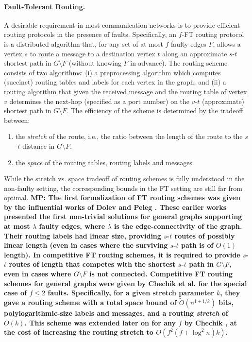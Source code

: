 \paragraph{Fault-Tolerant Routing.} A desirable requirement in most communication networks is to provide efficient routing protocols in the presence of faults. Specifically, an $f$-FT routing protocol is a distributed algorithm that, for any set of at most $f$ faulty edges $F$, allows a vertex $s$ to route a message to a destination vertex $t$ along an approximate $s$-$t$ shortest path in $G \setminus F$ (without knowing $F$ in advance). The routing scheme consists of two algorithms: (i) a preprocessing algorithm which computes (succinct) routing tables and labels for each vertex in the graph; and (ii) a routing algorithm that given the received message and the routing table of vertex $v$ determines the next-hop (specified as a port number) on the $v$-$t$ (approximate) shortest path in $G \setminus F$. The efficiency of the scheme is determined by the tradeoff between: 
\begin{enumerate}[noitemsep]
\item the \emph{stretch} of the route, i.e., the ratio between the length of the route to the $s$-$t$ distance in $G \setminus F$. 
\item the \emph{space} of the routing tables, routing labels and messages. 
\end{enumerate}
While the stretch vs. space tradeoff of routing schemes is fully understood in the non-faulty setting, the corresponding bounds in the FT setting are still far from optimal.  \textbf{MP: The first formalization of FT routing schemes was given by the influential works of Dolev \cite{dolev1984new} and Peleg \cite{peleg1987fault}. These earlier works presented the first non-trivial solutions for general graphs supporting at most $\lambda$ faulty edges, where $\lambda$ is the edge-connectivity of the graph. Their routing labels had linear size, providing $s$-$t$ routes of possibly linear length (even in cases where the surviving $s$-$t$ path is of $O(1)$ length). In competitive FT routing schemes, it is required to provide $s$-$t$ routes of length that competes with the shortest $s$-$t$ path in $G \setminus F$, even in cases where $G \setminus F$ is not connected. Competitive FT routing schemes \cite{peleg2009good} for general graphs were given by Chechik et al. \cite{ChechikLPR10,chechik2012f} for the special case of $f\leq 2$ faults. 
Specifically, for a given stretch parameter $k$, they gave a routing scheme with a total space bound of $\widetilde{O}(n^{1+1/k})$ bits, polylogarithmic-size labels and messages, and a routing \emph{stretch} of $O(k)$. 
This scheme was extended later on for any $f$ by Chechik \cite{chechik2011fault}, at the cost of increasing the routing stretch to $O(f^2(f+\log^2 n)k)$.}
